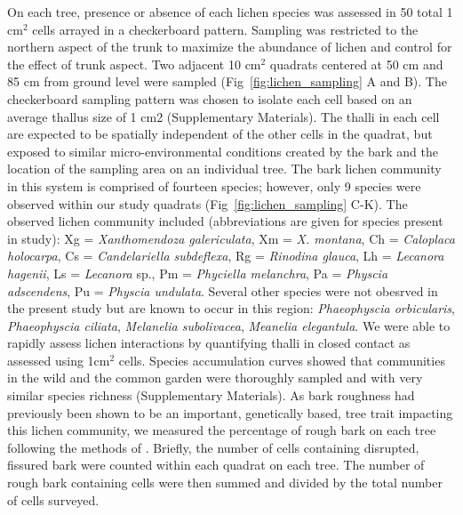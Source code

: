 \documentclass[9pt,twocolumn,twoside,lineno]{pnas-new}
\begin{document}
{On each tree, presence or absence of each lichen species was assessed
in 50 total 1 cm$^2$ cells arrayed in a checkerboard pattern. Sampling
was restricted to the northern aspect of the trunk to maximize the
abundance of lichen and control for the effect of trunk aspect. Two
adjacent 10 cm$^2$ quadrats centered at 50 cm and 85 cm from ground
level were sampled (Fig~\ref{fig:lichen_sampling} A and B). The
checkerboard sampling pattern was chosen to isolate each cell based on
an average thallus size of 1 cm2 (Supplementary Materials). The thalli
in each cell are expected to be spatially independent of the other
cells in the quadrat, but exposed to similar micro-environmental
conditions created by the bark and the location of the sampling area
on an individual tree. The bark lichen community in this system is
comprised of fourteen species; however, only 9 species were observed
within our study quadrats (Fig~\ref{fig:lichen_sampling} C-K). The
observed lichen community included (abbreviations are given for
species present in study): Xg = \textit{Xanthomendoza galericulata},
Xm = \textit{X. montana}, Ch = \textit{Caloplaca holocarpa}, Cs =
\textit{Candelariella subdeflexa}, Rg = \textit{Rinodina glauca}, Lh =
\textit{Lecanora hagenii}, Ls = \textit{Lecanora} sp., Pm =
\textit{Phyciella melanchra}, Pa = \textit{Physcia adscendens}, Pu =
\textit{Physcia undulata}. Several other species were not obesrved in
the present study but are known to occur in this region:
\textit{Phaeophyscia orbicularis}, \textit{Phaeophyscia ciliata},
\textit{Melanelia subolivacea}, \textit{Meanelia elegantula}.  We were
able to rapidly assess lichen interactions by quantifying thalli in
closed contact as assessed using 1cm$^2$ cells. Species accumulation
curves showed that communities in the wild and the common garden were
thoroughly sampled and with very similar species richness
(Supplementary Materials). As bark roughness had previously been shown
to be an important, genetically based, tree trait impacting this
lichen community, we measured the percentage of rough bark on each
tree following the methods of \citep{Lamit2012}. Briefly, the number
of cells containing disrupted, fissured bark were counted within each
quadrat on each tree. The number of rough bark containing cells were
then summed and divided by the total number of cells surveyed.


}
\end{document}
